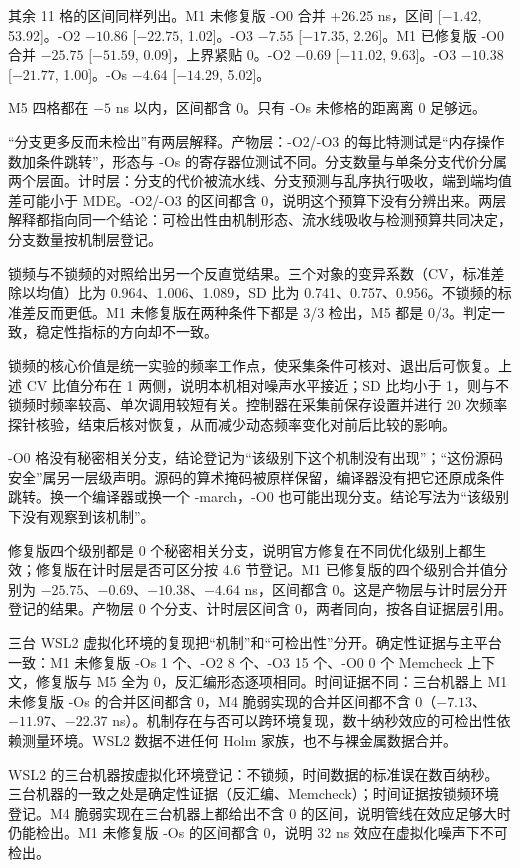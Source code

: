其余 11 格的区间同样列出。M1 未修复版 -O0 合并 +26.25 ns，区间 [$-1.42$, 53.92]。-O2 $-10.86$ [$-22.75$, 1.02]。-O3 $-7.55$ [$-17.35$, 2.26]。M1 已修复版 -O0 合并 $-25.75$ [$-51.59$, 0.09]，上界紧贴 0。-O2 $-0.69$ [$-11.02$, 9.63]。-O3 $-10.38$ [$-21.77$, 1.00]。-Os $-4.64$ [$-14.29$, 5.02]。

M5 四格都在 $-5$ ns 以内，区间都含 0。只有 -Os 未修格的距离离 0 足够远。

“分支更多反而未检出”有两层解释。产物层：-O2/-O3 的每比特测试是“内存操作数加条件跳转”，形态与 -Os 的寄存器位测试不同。分支数量与单条分支代价分属两个层面。计时层：分支的代价被流水线、分支预测与乱序执行吸收，端到端均值差可能小于 MDE。-O2/-O3 的区间都含 0，说明这个预算下没有分辨出来。两层解释都指向同一个结论：可检出性由机制形态、流水线吸收与检测预算共同决定，分支数量按机制层登记。

锁频与不锁频的对照给出另一个反直觉结果。三个对象的变异系数（CV，标准差除以均值）比为 0.964、1.006、1.089，SD 比为 0.741、0.757、0.956。不锁频的标准差反而更低。M1 未修复版在两种条件下都是 3/3 检出，M5 都是 0/3。判定一致，稳定性指标的方向却不一致。%

锁频的核心价值是统一实验的频率工作点，使采集条件可核对、退出后可恢复。上述 CV 比值分布在 1 两侧，说明本机相对噪声水平接近；SD 比均小于 1，则与不锁频时频率较高、单次调用较短有关。控制器在采集前保存设置并进行 20 次频率探针核验，结束后核对恢复，从而减少动态频率变化对前后比较的影响。


-O0 格没有秘密相关分支，结论登记为“该级别下这个机制没有出现”；“这份源码安全”属另一层级声明。源码的算术掩码被原样保留，编译器没有把它还原成条件跳转。换一个编译器或换一个 -march，-O0 也可能出现分支。结论写法为“该级别下没有观察到该机制”。

修复版四个级别都是 0 个秘密相关分支，说明官方修复在不同优化级别上都生效；修复版在计时层是否可区分按 4.6 节登记。M1 已修复版的四个级别合并值分别为 $-25.75$、$-0.69$、$-10.38$、$-4.64$ ns，区间都含 0。这是产物层与计时层分开登记的结果。产物层 0 个分支、计时层区间含 0，两者同向，按各自证据层引用。

三台 WSL2 虚拟化环境的复现把“机制”和“可检出性”分开。确定性证据与主平台一致：M1 未修复版 -Os 1 个、-O2 8 个、-O3 15 个、-O0 0 个 Memcheck 上下文，修复版与 M5 全为 0，反汇编形态逐项相同。时间证据不同：三台机器上 M1 未修复版 -Os 的合并区间都含 0，M4 脆弱实现的合并区间都不含 0（$-7.13$、$-11.97$、$-22.37$ ns）。机制存在与否可以跨环境复现，数十纳秒效应的可检出性依赖测量环境。WSL2 数据不进任何 Holm 家族，也不与裸金属数据合并。%

WSL2 的三台机器按虚拟化环境登记：不锁频，时间数据的标准误在数百纳秒。三台机器的一致之处是确定性证据（反汇编、Memcheck）；时间证据按锁频环境登记。M4 脆弱实现在三台机器上都给出不含 0 的区间，说明管线在效应足够大时仍能检出。M1 未修复版 -Os 的区间都含 0，说明 32 ns 效应在虚拟化噪声下不可检出。

